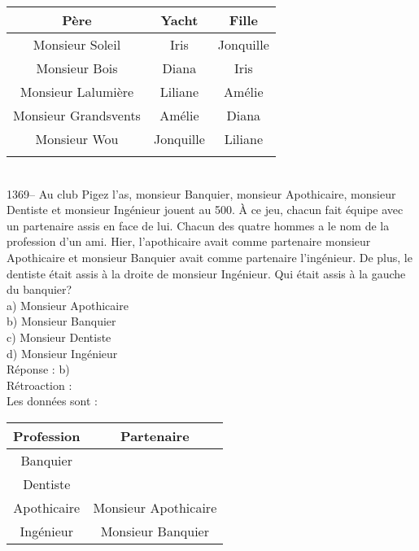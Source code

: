 ﻿\documentclass[letterpaper, 12pt]{article}
\begin{document}
\begin{tabular}{|c|c|c|} \hline
{\bf P\`ere} & {\bf Yacht} & {\bf Fille}  \\ \hline \hline

Monsieur Soleil        & Iris      &  Jonquille \\ \hline Monsieur
Bois          & Diana     &  Iris      \\ \hline Monsieur
Lalumi\`ere & Liliane   &  Am\'elie  \\ \hline Monsieur Grandsvents
& Am\'elie
&  Diana     \\ \hline Monsieur Wou & Jonquille &  Liliane   \\
\hline
\multicolumn{3}{c}{}\\
\end{tabular}\\


1369-- Au club \og Pigez l'as\fg , monsieur Banquier, monsieur
Apothicaire, monsieur Dentiste et monsieur Ing\'enieur jouent \og au
500\fg.  \`A ce jeu, chacun fait \'equipe avec un partenaire assis
en face de lui.  Chacun des quatre hommes a le nom de la profession
d'un ami.  Hier, l'apothicaire avait comme partenaire monsieur
Apothicaire et monsieur Banquier avait comme partenaire
l'ing\'enieur.  De plus, le dentiste \'etait assis \`a la droite
de monsieur Ing\'enieur.  Qui \'etait assis \`a la gauche du banquier?\\
a) Monsieur Apothicaire\\
b) Monsieur Banquier\\
c) Monsieur Dentiste\\
d) Monsieur Ing\'enieur\\

R\'eponse : b)\\

R\'etroaction : \\
Les donn\'ees sont : \\
\begin{tabular}{|c|c|} \hline
{\bf Profession} & {\bf Partenaire}    \\ \hline \hline

Banquier      &                       \\ \hline Dentiste      &
\\ \hline Apothicaire   & Monsieur Apothicaire  \\ \hline
Ing\'enieur   & Monsieur Banquier     \\ \hline
\end{tabular}\\
\end{document}
